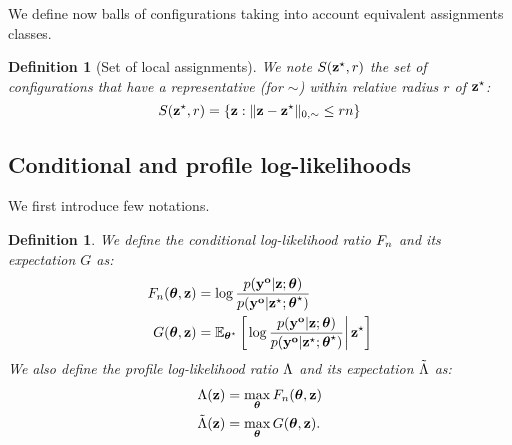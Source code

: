 \documentclass[]{imsart}
\newcommand{\1}{\mathds{1}}
\numberwithin{equation}{section}
\theoremstyle{plain}
\newtheorem{dof}[thm]{Definition}
\theoremstyle{remark}
\begin{document}
We define now balls of configurations taking into account equivalent assignments classes.
\begin{dof}[Set of local assignments]
  \label{prop:small-deviations-profile-likelihood}
  We note $S(\mathbf{z}^\star, r)$ the set of configurations that have a representative (for $\sim$) within relative radius $r$ of $\mathbf{z}^\star$:
  \begin{equation*}
    S(\bzs, r) = \left\{ \bz : \|\bz - \bzs\|_{0, \sim} \leq r \n \right\}
  \end{equation*}
\end{dof}

\subsection{Conditional and profile log-likelihoods}
\label{sec:cond-and-prof-likelihood} 
%
We first introduce few notations.

\begin{dof}
\label{def:conditional-profile-likelihood}
We define the conditional log-likelihood ratio $F_{n}$ and its expectation $G$ as:
\begin{equation}
  \label{eq:conditional-likelihood}
  \begin{aligned}
    \Fn(\btheta, \bz) & = \log \frac{\prob(\byo | \bz;\btheta)}{\prob(\byo | \bzs;\bthetas)} \\
    \G(\btheta, \bz) & = \Esp_{\bthetas} \left[ \left. \log \frac{\prob(\byo | \bz;\btheta)}{\prob(\byo | \bzs;\bthetas)} \right| \bzs  \right] \\
  \end{aligned}
\end{equation}
We also define the profile log-likelihood ratio $\Lambda$ and its expectation $\tilde{\Lambda}$ as:
\begin{equation}
  \label{eq:profile-likelihood}
  \begin{aligned}
    \Lamb(\bz) & = \max_{\btheta} \Fn(\btheta, \bz)  \\
    \Lambtilde(\bz) & = \max_{\btheta} \G(\btheta, \bz).
  \end{aligned}
\end{equation}
\end{dof}
\end{document}
